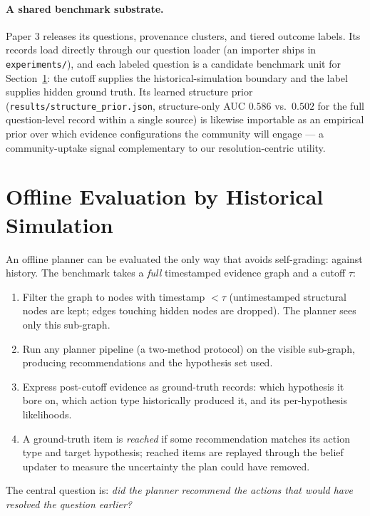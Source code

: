 \documentclass[11pt]{article}
\begin{document}
\paragraph{A shared benchmark substrate.} Paper 3 releases its
questions, provenance clusters, and tiered outcome labels. Its records
load directly through our question loader (an importer ships in
\texttt{experiments/}), and each labeled question is a candidate
benchmark unit for Section~\ref{sec:eval}: the cutoff supplies the
historical-simulation boundary and the label supplies hidden ground
truth. Its learned structure prior
(\texttt{results/structure\_prior.json}, structure-only AUC $0.586$
vs.\ $0.502$ for the full question-level record within a single source)
is likewise importable as an empirical prior over which evidence
configurations the community will engage --- a community-uptake signal
complementary to our resolution-centric utility.

\section{Offline Evaluation by Historical Simulation}
\label{sec:eval}

An offline planner can be evaluated the only way that avoids
self-grading: against history. The benchmark takes a \emph{full}
timestamped evidence graph and a cutoff $\tau$:

\begin{enumerate}
  \item Filter the graph to nodes with timestamp $< \tau$
  (untimestamped structural nodes are kept; edges touching hidden nodes
  are dropped). The planner sees only this sub-graph.
  \item Run any planner pipeline (a two-method protocol) on the visible
  sub-graph, producing recommendations and the hypothesis set used.
  \item Express post-cutoff evidence as ground-truth records: which
  hypothesis it bore on, which action type historically produced it, and
  its per-hypothesis likelihoods.
  \item A ground-truth item is \emph{reached} if some recommendation
  matches its action type and target hypothesis; reached items are
  replayed through the belief updater to measure the uncertainty the plan
  could have removed.
\end{enumerate}

The central question is: \emph{did the planner recommend the actions that
would have resolved the question earlier?}
\end{document}
